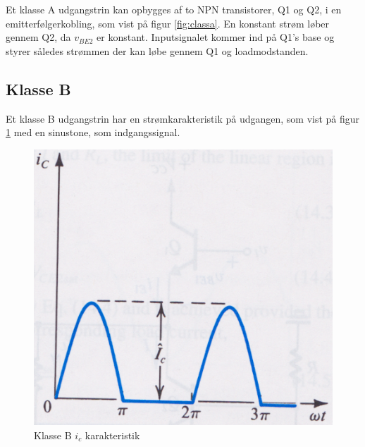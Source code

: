 Et klasse A udgangstrin kan opbygges af to NPN transistorer, Q1 og Q2, i en emitterfølgerkobling, som vist på figur \ref{fig:classa}. En konstant strøm løber gennem Q2, da $v_{BE2}$ er konstant. Inputsignalet kommer ind på Q1's base og styrer således strømmen der kan løbe gennem Q1 og loadmodstanden. 



\subsection{Klasse B}

Et klasse B udgangstrin har en strømkarakteristik på udgangen, som vist på figur \ref{fig:klasseb} med en sinustone, som indgangssignal. 

\begin{figure}[ht]
\begin{minipage}[b]{0.5\linewidth}
\centering
\includegraphics[scale=.35]{indledende_analyse/klasser/klasseb.png}
\caption{Klasse B $i_c$ karakteristik}
\label{fig:klasseb}
\end{minipage}
\hspace{0.5cm}
\begin{minipage}[b]{0.5\linewidth}
\centering

\end{minipage}
\end{figure}
